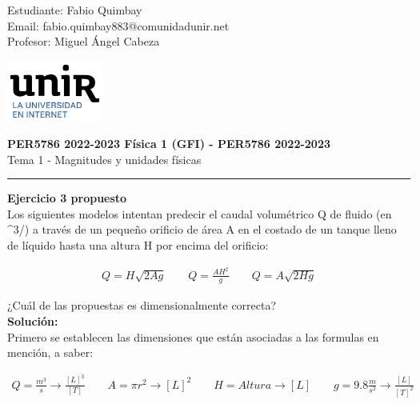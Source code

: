 \documentclass[11pt,letterpaper]{article}
\begin{document}
\pagestyle{plain}

\begin{flushleft}
Estudiante: Fabio Quimbay\\
Email: fabio.quimbay883@comunidadunir.net\\
Profesor: Miguel Ángel Cabeza\\
\end{flushleft}

\begin{flushright}\vspace{-20mm}
\includegraphics[height=2cm]{logo.png}
\end{flushright}
 
\begin{center}\vspace{0cm}
\textbf{\large PER5786 2022-2023  Física 1 (GFI) - PER5786 2022-2023}\\
 Tema 1 - Magnitudes y unidades físicas
\end{center}

 
\rule{\linewidth}{0.1mm}

\bigskip
\bigskip

\textbf{Ejercicio 3 propuesto}\\

Los siguientes modelos intentan predecir el caudal volumétrico Q de fluido (en \textasciicircum3/) a través de un pequeño orificio de área A en el costado de un tanque lleno de líquido hasta una altura H por encima del orificio:

\begin{gather}
Q=H\sqrt{2Ag} \qquad Q=\frac{AH^2}{g} \qquad Q=A\sqrt{2Hg}
\end{gather}

¿Cuál de las propuestas es dimensionalmente correcta?\\

\textbf{Solución:}\\

Primero se establecen las dimensiones que están asociadas a las formulas en mención, a saber:

\begin{equation*}
\begin{split}
Q = \frac{m^3}{s} \rightarrow \frac{[L]^3}{[T]}  \qquad
A  = \pi r^2 \rightarrow [L]^2  \qquad
H = Altura \rightarrow [L]  \qquad
g = 9.8 \frac{m}{s^2} \rightarrow \frac{[L]}{[T]^2}
\end{split}
\end{equation*}
\end{document}
